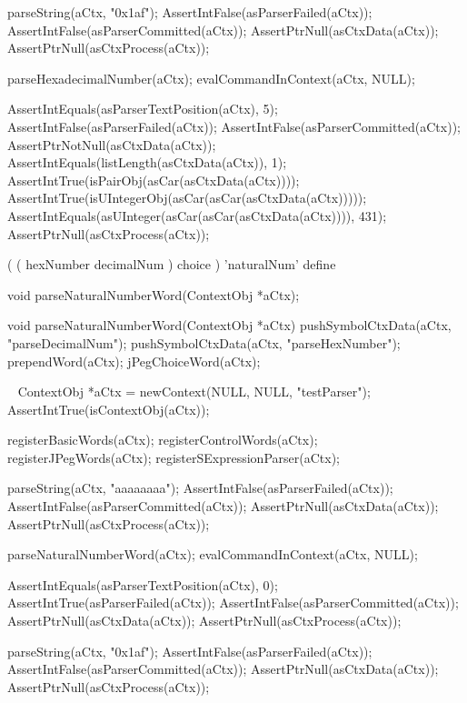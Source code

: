 \startCTest
  parseString(aCtx, "0x1af");
  AssertIntFalse(asParserFailed(aCtx));
  AssertIntFalse(asParserCommitted(aCtx));
  AssertPtrNull(asCtxData(aCtx));
  AssertPtrNull(asCtxProcess(aCtx));
  
  parseHexadecimalNumber(aCtx);
  evalCommandInContext(aCtx, NULL);
  
  AssertIntEquals(asParserTextPosition(aCtx), 5);
  AssertIntFalse(asParserFailed(aCtx));
  AssertIntFalse(asParserCommitted(aCtx));
  AssertPtrNotNull(asCtxData(aCtx));
  AssertIntEquals(listLength(asCtxData(aCtx)), 1);
  AssertIntTrue(isPairObj(asCar(asCtxData(aCtx))));
  AssertIntTrue(isUIntegerObj(asCar(asCar(asCtxData(aCtx)))));
  AssertIntEquals(asUInteger(asCar(asCar(asCtxData(aCtx)))), 431);  
  AssertPtrNull(asCtxProcess(aCtx));
\stopCTest
\stopTestCase
\stopTestSuite

\startTestSuite[parseNaturalNumberWord]

\starttyping
(
  ( hexNumber decimalNum ) choice
) 'naturalNum' define
\stoptyping

\startCHeader
void parseNaturalNumberWord(ContextObj *aCtx);
\stopCHeader

\startCCode
void parseNaturalNumberWord(ContextObj *aCtx) {
  pushSymbolCtxData(aCtx, "parseDecimalNum");
  pushSymbolCtxData(aCtx, "parseHexNumber");
  prependWord(aCtx);
  jPegChoiceWord(aCtx);
}
\stopCCode

\CTestsSuiteSetup\
\startCTest
  ContextObj *aCtx = newContext(NULL, NULL, "testParser");
  AssertIntTrue(isContextObj(aCtx));
  
  registerBasicWords(aCtx);
  registerControlWords(aCtx);
  registerJPegWords(aCtx);
  registerSExpressionParser(aCtx);
\stopCTest

\startCTest
  parseString(aCtx, "aaaaaaaa");
  AssertIntFalse(asParserFailed(aCtx));
  AssertIntFalse(asParserCommitted(aCtx));
  AssertPtrNull(asCtxData(aCtx));
  AssertPtrNull(asCtxProcess(aCtx));
  
  parseNaturalNumberWord(aCtx);
  evalCommandInContext(aCtx, NULL);
  
  AssertIntEquals(asParserTextPosition(aCtx), 0);
  AssertIntTrue(asParserFailed(aCtx));
  AssertIntFalse(asParserCommitted(aCtx));
  AssertPtrNull(asCtxData(aCtx));
  AssertPtrNull(asCtxProcess(aCtx));
\stopCTest
\stopTestCase

\startCTest
  parseString(aCtx, "0x1af");
  AssertIntFalse(asParserFailed(aCtx));
  AssertIntFalse(asParserCommitted(aCtx));
  AssertPtrNull(asCtxData(aCtx));
  AssertPtrNull(asCtxProcess(aCtx));
  
